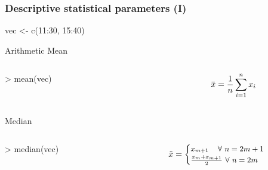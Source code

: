 \documentclass[ucs]{beamer}
\newcommand{\overbar}[1]{\mkern 1.5mu\overline{\mkern-1.5mu#1\mkern-1.5mu}\mkern 1.5mu}
\begin{document}
\begin{frame}
  \frametitle{Descriptive statistical parameters (I)}

  \ttfamily vec <- c(11:30, 15:40)
  \begin{block}{Arithmetic Mean}
    \begin{columns}
      \begin{column}{0.6\textwidth}       
    \ttfamily > mean(vec)
      \end{column}
          \begin{column}{0.4\textwidth}
\[ 
\overbar{x} = \frac{1}{n}\sum_{i=1}^{n}{x_i}
\] 
      \end{column}
  \end{columns}
  \end{block}

\begin{block}{Median}
  \begin{columns}
    \begin{column}{0.5\textwidth}       
      \ttfamily > median(vec)
    \end{column}
    \begin{column}{0.5\textwidth} \[ \tilde{x} =
      \small \begin{cases}
   x_{m+1}  ~~~\, \forall ~n = 2m + 1   \\
   \frac{ x_m + x_{m+1} }{2} ~ \forall~ n = 2m  
   \end{cases}   
      \] 
    \end{column}
  \end{columns}
\end{block}
\end{frame}
\end{document}
